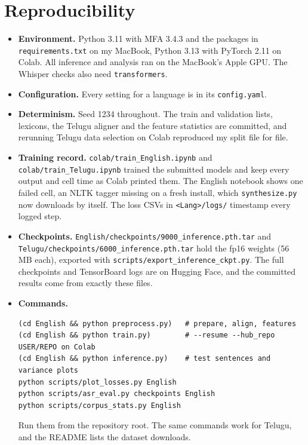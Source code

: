 \documentclass[11pt,a4paper]{article}
\newcommand{\code}[1]{\texttt{#1}}
\begin{document}
\section{Reproducibility}
\label{sec:repro}
\begin{itemize}
\item \textbf{Environment.} Python 3.11 with MFA 3.4.3 and the packages in \code{requirements.txt} on my MacBook,
  Python 3.13 with PyTorch 2.11 on Colab. All inference and analysis ran on the MacBook's Apple GPU. The
  Whisper checks also need \code{transformers}.
\item \textbf{Configuration.} Every setting for a language is in its \code{config.yaml}.
\item \textbf{Determinism.} Seed 1234 throughout. The train and validation lists, lexicons, the Telugu aligner and
  the feature statistics are committed, and rerunning Telugu data selection on Colab reproduced my split file for
  file.
\item \textbf{Training record.} \code{colab/train\_English.ipynb} and \code{colab/train\_Telugu.ipynb} trained the
  submitted models and keep every output and cell time as Colab printed them. The English notebook shows one failed cell, an NLTK
  tagger missing on a fresh install, which \code{synthesize.py} now downloads by itself. The loss CSVs in \code{<Lang>/logs/} timestamp every logged step.
\item \textbf{Checkpoints.} \code{English/checkpoints/9000\_inference.pth.tar} and\\
  \code{Telugu/checkpoints/6000\_inference.pth.tar} hold the fp16 weights (56 MB each), exported with
  \code{scripts/export\_inference\_ckpt.py}. The full checkpoints and TensorBoard logs are on Hugging Face, and the
  committed results come from exactly these files.
\item \textbf{Commands.}
\begin{verbatim}
(cd English && python preprocess.py)   # prepare, align, features
(cd English && python train.py)        # --resume --hub_repo USER/REPO on Colab
(cd English && python inference.py)    # test sentences and variance plots
python scripts/plot_losses.py English
python scripts/asr_eval.py checkpoints English
python scripts/corpus_stats.py English
\end{verbatim}
  Run them from the repository root. The same commands work for Telugu, and the README lists the dataset
  downloads.
\end{itemize}

\appendix
\end{document}
